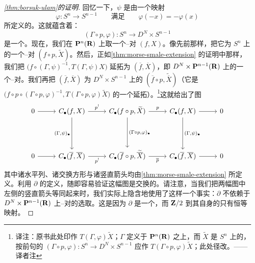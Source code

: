 \begin{proof}[\cref{thm:borsuk-ulam}的证明]
回忆一下，$\psi$ 是由一个映射
\[
\varphi\colon S^n\longrightarrow S^{n-1}
  \qquad\text{满足}\qquad \varphi(-x)=-\varphi(x)
\]
所定义的。这就蕴含着：
\[
(\Gamma\circ p,\varphi)\colon S^n\longrightarrow D^N\times S^{n-1}
\]
是一个\trEmbedding。现在，我们在 $\mathbf{P}^n(\mathbf{R})$ 上取一个\trMorse--\trSmale{}对 $(f,X)$。像先前那样，把它\trLift{}为 $S^n$ 上的一个\trMorse--\trSmale{}对 $(f\circ p,\widetilde X)$。然后，正如\cref{thm:morse-smale-extension} 的证明中那样，我们把 $\bigl(f\circ(\Gamma,\psi)^{-1},T(\Gamma,\psi)X\bigr)$ 延拓为 $(\overline f,\overline X)$，即 $D^N\times\mathbf{P}^{n-1}(\mathbf{R})$ 上的一个\trMorse--\trSmale{}对。我们再把 $(\overline f,\overline X)$ \trLift{}为 $D^N\times S^{n-1}$ 上的 $(\overline f\circ p,\widetilde{\overline X})$（它是 $\bigl(f\circ p\circ(\Gamma\circ p,\varphi)^{-1},T(\Gamma\circ p,\varphi)\widetilde X\bigr)$ 的一个延拓）。\footnote{译注：原书此处印作 $T(\Gamma,\varphi)\widetilde X$；$\Gamma$ 定义于 $\mathbf{P}^n(\mathbf{R})$ 之上，而 $\widetilde X$ 是 $S^n$ 上的\trVectorField，按前句的\trEmbedding{} $(\Gamma\circ p,\varphi)\colon S^n\to D^N\times S^{n-1}$ 应作 $T(\Gamma\circ p,\varphi)\widetilde X$；此处径改。——译者注}这就给出了图
\[
\begin{tikzcd}[column sep=0.92cm,row sep=1.55cm]
0 \ar[r] & C_\bullet(f,X) \ar[r,"p^!"] \ar[d,"{(\Gamma,\psi)_\bullet}"']
  & C_\bullet(f\circ p,\widetilde X) \ar[r,"p"] \ar[d,"{(\Gamma\circ p,\varphi)_\bullet}"]
  & C_\bullet(f,X) \ar[r] \ar[d,"{(\Gamma,\psi)_\bullet}"] & 0 \\
0 \ar[r] & C_\bullet(\overline f,\overline X) \ar[r,"p^!"']
  & C_\bullet(\overline f\circ p,\widetilde{\overline X}) \ar[r,"\overline p"']
  & C_\bullet(\overline f,\overline X) \ar[r] & 0
\end{tikzcd}
\]
其中诸水平\trExact{}列、诸交换方形与诸竖直箭头均由\cref{thm:morse-smale-extension} 所定义。利用\trConnectingHomomorphism{} $\partial$ 的定义，随即容易验证这幅图是交换的。请注意，当我们把两幅图中左侧的竖直箭头等同起来时，我们实际上隐含地使用了这样一个事实：$\partial$ 不依赖于 $D^N\times\mathbf{P}^{n-1}(\mathbf{R})$ 上\trMorse--\trSmale{}对的选取。这是因为 $\partial$ 是一个\trIsomorphism，而 $\mathbf{Z}/2$ 到其自身的\trIsomorphism{}只有恒等映射。
\end{proof}
